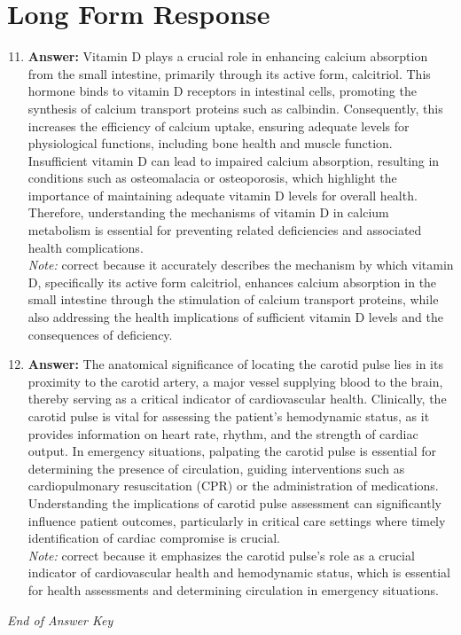 \documentclass[12pt]{article}
\begin{document}
\section*{Long Form Response}
\begin{enumerate}[label=\arabic*.]
\setcounter{enumi}{10}
\item \textbf{Answer:} Vitamin D plays a crucial role in enhancing calcium absorption from the small intestine, primarily through its active form, calcitriol. This hormone binds to vitamin D receptors in intestinal cells, promoting the synthesis of calcium transport proteins such as calbindin. Consequently, this increases the efficiency of calcium uptake, ensuring adequate levels for physiological functions, including bone health and muscle function. Insufficient vitamin D can lead to impaired calcium absorption, resulting in conditions such as osteomalacia or osteoporosis, which highlight the importance of maintaining adequate vitamin D levels for overall health. Therefore, understanding the mechanisms of vitamin D in calcium metabolism is essential for preventing related deficiencies and associated health complications.
\\ \textit{Note:} correct because it accurately describes the mechanism by which vitamin D, specifically its active form calcitriol, enhances calcium absorption in the small intestine through the stimulation of calcium transport proteins, while also addressing the health implications of sufficient vitamin D levels and the consequences of deficiency.
\item \textbf{Answer:} The anatomical significance of locating the carotid pulse lies in its proximity to the carotid artery, a major vessel supplying blood to the brain, thereby serving as a critical indicator of cardiovascular health. Clinically, the carotid pulse is vital for assessing the patient's hemodynamic status, as it provides information on heart rate, rhythm, and the strength of cardiac output. In emergency situations, palpating the carotid pulse is essential for determining the presence of circulation, guiding interventions such as cardiopulmonary resuscitation (CPR) or the administration of medications. Understanding the implications of carotid pulse assessment can significantly influence patient outcomes, particularly in critical care settings where timely identification of cardiac compromise is crucial.
\\ \textit{Note:} correct because it emphasizes the carotid pulse's role as a crucial indicator of cardiovascular health and hemodynamic status, which is essential for health assessments and determining circulation in emergency situations.
\end{enumerate}

\vfill
\noindent\textit{End of Answer Key}
\end{document}
